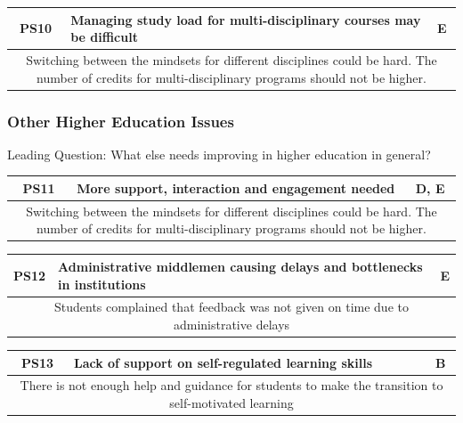 \begin{table}[!ht]
	\begin{tabularx}{\textwidth}{|c|X|c|}
		\hline
		PS10 & \textbf{Managing study load for multi-disciplinary courses may be difficult} & E \\
		\hline
		\multicolumn{3}{|X|}{Switching between the mindsets for different disciplines could be hard.
			The number of credits for multi-disciplinary programs should not be higher.}            \\
		\hline
	\end{tabularx}
\end{table}

\subsubsection{Other Higher Education Issues}

Leading Question: What else needs improving in higher education in general?

\begin{table}[!ht]
	\begin{tabularx}{\textwidth}{|c|X|c|}
		\hline
		PS11 & \textbf{More support, interaction and engagement needed} & D, E       \\
		\hline
		\multicolumn{3}{|X|}{Switching between the mindsets for different disciplines could be hard.
			The number of credits for multi-disciplinary programs should not be higher.} \\
		\hline
	\end{tabularx}
\end{table}
\begin{table}[!ht]
	\begin{tabularx}{\textwidth}{|c|X|c|}
		\hline
		PS12 & \textbf{Administrative middlemen causing delays and bottlenecks in institutions} & E                \\
		\hline
		\multicolumn{3}{|X|}{Students complained that feedback was not given on time due to administrative delays} \\
		\hline
	\end{tabularx}
\end{table}
\begin{table}[!ht]
	\begin{tabularx}{\textwidth}{|c|X|c|}
		\hline
		PS13 & \textbf{Lack of support on self-regulated learning skills} & B                                                      \\
		\hline
		\multicolumn{3}{|X|}{There is not enough help and guidance for students to make the transition to self-motivated learning} \\
		\hline
	\end{tabularx}
\end{table}

